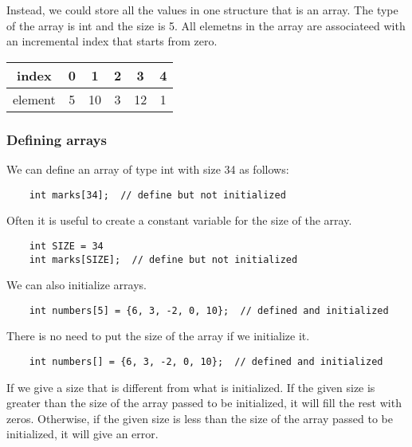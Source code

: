\documentclass[]{article}
\begin{document}
Instead, we could store all the values in one structure that is an array. The type of the array is int and the size is 5. All elemetns in the array are associateed with an incremental index that starts from zero.

\begin{center}
	\begin{table}[h]\centering
		\begin{tabular}{|c|c|c|c|c|c|}\hline
			index & 0 & 1 & 2 & 3 & 4 \\ \hline
			element & 5 & 10 & 3 & 12 & 1 \\ \hline
		\end{tabular}
	\end{table}
\end{center}

\subsubsection{Defining arrays}
\bigbreak

We can define an array of type int with size 34 as follows:

\begin{lstlisting}
	int marks[34];  // define but not initialized
\end{lstlisting}\bigbreak

Often it is useful to create a constant variable for the size of the array.

\begin{lstlisting}
	int SIZE = 34
	int marks[SIZE];  // define but not initialized
\end{lstlisting}\bigbreak

We can also initialize arrays.

\begin{lstlisting}
	int numbers[5] = {6, 3, -2, 0, 10};  // defined and initialized
\end{lstlisting}\bigbreak

There is no need to put the size of the array if we initialize it.

\begin{lstlisting}
	int numbers[] = {6, 3, -2, 0, 10};  // defined and initialized
\end{lstlisting}\bigbreak

If we give a size that is different from what is initialized. If the given size is greater than the size of the array passed to be initialized, it will fill the rest with zeros. Otherwise, if the given size is less than the size of the array passed to be initialized, it will give an error. 
\end{document}
